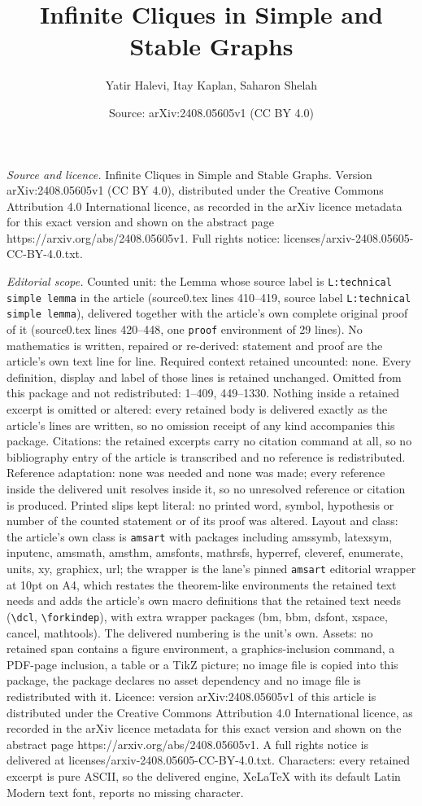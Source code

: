 \documentclass[10pt,a4paper]{amsart}
\title[Infinite Cliques in Simple and Stable Graphs]{Infinite Cliques in Simple and Stable Graphs}
\author{Yatir Halevi, Itay Kaplan, Saharon Shelah}
\date{Source: arXiv:2408.05605v1 (CC BY 4.0)}
\begin{document}
\maketitle

\noindent\emph{Source and licence.} Infinite Cliques in Simple and Stable Graphs. Version arXiv:2408.05605v1 (CC BY 4.0), distributed under the Creative Commons Attribution 4.0 International licence, as recorded in the arXiv licence metadata for this exact version and shown on the abstract page https://arxiv.org/abs/2408.05605v1. Full rights notice: licenses/arxiv-2408.05605-CC-BY-4.0.txt.\par\smallskip

\noindent\textit{Editorial scope.} Counted unit: the Lemma whose source label is \texttt{L:technical simple lemma} in the article (source0.tex lines 410--419, source label \texttt{L:technical simple lemma}), delivered together with the article's own complete original proof of it (source0.tex lines 420--448, one \texttt{proof} environment of 29 lines). No mathematics is written, repaired or re-derived: statement and proof are the article's own text line for line. Required context retained uncounted: none. Every definition, display and label of those lines is retained unchanged. Omitted from this package and not redistributed: 1--409, 449--1330. Nothing inside a retained excerpt is omitted or altered: every retained body is delivered exactly as the article's lines are written, so no omission receipt of any kind accompanies this package. Citations: the retained excerpts carry no citation command at all, so no bibliography entry of the article is transcribed and no reference is redistributed. Reference adaptation: none was needed and none was made; every reference inside the delivered unit resolves inside it, so no unresolved reference or citation is produced. Printed slips kept literal: no printed word, symbol, hypothesis or number of the counted statement or of its proof was altered. Layout and class: the article's own class is \texttt{amsart} with packages including amssymb, latexsym, inputenc, amsmath, amsthm, amsfonts, mathrsfs, hyperref, cleveref, enumerate, units, xy, graphicx, url; the wrapper is the lane's pinned \texttt{amsart} editorial wrapper at 10pt on A4, which restates the theorem-like environments the retained text needs and adds the article's own macro definitions that the retained text needs (\texttt{\textbackslash dcl}, \texttt{\textbackslash forkindep}), with extra wrapper packages (bm, bbm, dsfont, xspace, cancel, mathtools). The delivered numbering is the unit's own. Assets: no retained span contains a figure environment, a graphics-inclusion command, a PDF-page inclusion, a table or a TikZ picture; no image file is copied into this package, the package declares no asset dependency and no image file is redistributed with it. Licence: version arXiv:2408.05605v1 of this article is distributed under the Creative Commons Attribution 4.0 International licence, as recorded in the arXiv licence metadata for this exact version and shown on the abstract page https://arxiv.org/abs/2408.05605v1. A full rights notice is delivered at licenses/arxiv-2408.05605-CC-BY-4.0.txt. Characters: every retained excerpt is pure ASCII, so the delivered engine, XeLaTeX with its default Latin Modern text font, reports no missing character.
\end{document}
